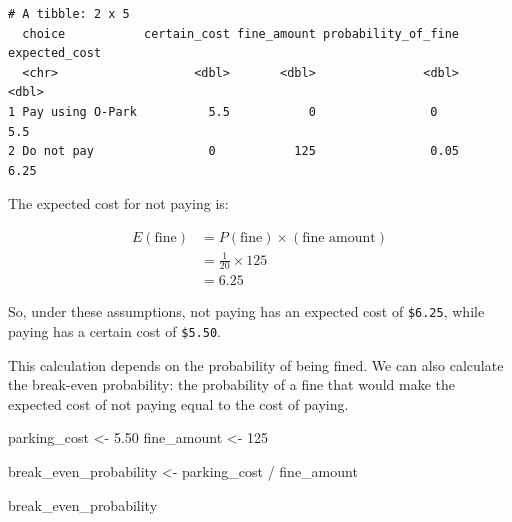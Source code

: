 \documentclass[
  letterpaper,
  DIV=11,
  numbers=noendperiod]{scrreprt}
\newenvironment{Shaded}{\begin{snugshade}}{\end{snugshade}}
\newcommand{\DecValTok}[1]{\textcolor[rgb]{0.68,0.00,0.00}{#1}}
\newcommand{\FloatTok}[1]{\textcolor[rgb]{0.68,0.00,0.00}{#1}}
\newcommand{\NormalTok}[1]{\textcolor[rgb]{0.00,0.23,0.31}{#1}}
\newcommand{\OtherTok}[1]{\textcolor[rgb]{0.00,0.23,0.31}{#1}}
\newcommand{\SpecialCharTok}[1]{\textcolor[rgb]{0.37,0.37,0.37}{#1}}
\begin{document}
\begin{verbatim}
# A tibble: 2 x 5
  choice           certain_cost fine_amount probability_of_fine expected_cost
  <chr>                   <dbl>       <dbl>               <dbl>         <dbl>
1 Pay using O-Park          5.5           0                0             5.5 
2 Do not pay                0           125                0.05          6.25
\end{verbatim}

The expected cost for not paying is:

\[
\begin{aligned}
E(\text{fine})
&=
P(\text{fine})\times(\text{fine amount}) \\
&=
\frac{1}{20}\times 125 \\
&=
6.25
\end{aligned}
\]

So, under these assumptions, not paying has an expected cost of
\texttt{\$6.25}, while paying has a certain cost of \texttt{\$5.50}.

\begin{table}

\caption{\label{tbl-parking-expected-value}Expected cost of paying for
parking or risking a fine}


\end{table}%

This calculation depends on the probability of being fined. We can also
calculate the break-even probability: the probability of a fine that
would make the expected cost of not paying equal to the cost of paying.

\begin{Shaded}
\begin{Highlighting}[]
\NormalTok{parking\_cost }\OtherTok{\textless{}{-}} \FloatTok{5.50}
\NormalTok{fine\_amount }\OtherTok{\textless{}{-}} \DecValTok{125}

\NormalTok{break\_even\_probability }\OtherTok{\textless{}{-}}\NormalTok{ parking\_cost }\SpecialCharTok{/}\NormalTok{ fine\_amount}

\NormalTok{break\_even\_probability}
\end{Highlighting}
\end{Shaded}
\end{document}
